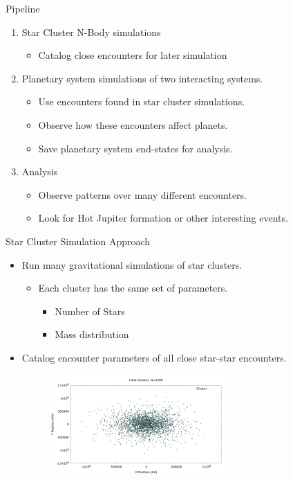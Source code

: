 \documentclass{beamer}
\begin{document}
\begin{frame}{Pipeline}
    \begin{enumerate}
        \item Star Cluster N-Body simulations
            \begin{itemize}
                \item Catalog close encounters for later simulation
            \end{itemize}
        \item Planetary system simulations of two interacting systems.
            \begin{itemize}
                \item Use encounters found in star cluster simulations.
                \item Observe how these encounters affect planets.
                \item Save planetary system end-states for analysis.
            \end{itemize}
        \item Analysis 
            \begin{itemize}
                \item Observe patterns over many different encounters.
                \item Look for Hot Jupiter formation or other interesting events.
            \end{itemize}
    \end{enumerate}
\end{frame}


\begin{frame}{Star Cluster Simulation Approach}
    \begin{itemize}
        \item Run many gravitational simulations of star clusters.
            \begin{itemize}
                \item Each cluster has the same set of parameters.
                \begin{itemize}
                    \item Number of Stars
                    \item Mass distribution
                \end{itemize}
            \end{itemize}
        \item Catalog encounter parameters of all close star-star encounters.
        \begin{figure}
            \includegraphics[height=1.5in]{cluster1.png}
        \end{figure}
    \end{itemize}
\end{frame}
\end{document}
